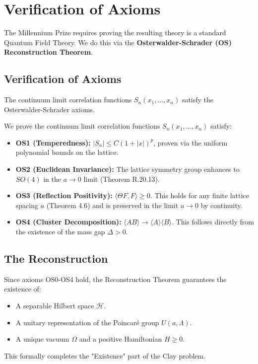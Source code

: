 \section{Verification of Axioms}
\label{sec:axioms}
\label{sec:osterwalder}

The Millennium Prize requires proving the resulting theory is a standard Quantum Field Theory. We do this via the \textbf{Osterwalder-Schrader (OS) Reconstruction Theorem}.

\subsection{Verification of Axioms}
\begin{theorem}[OS Axioms]
\label{thm:os-axioms-verified}
The continuum limit correlation functions $S_n(x_1, \dots, x_n)$ satisfy the Osterwalder-Schrader axioms.
\end{theorem}
We prove the continuum limit correlation functions $S_n(x_1, \dots, x_n)$ satisfy:
\begin{itemize}
\item \textbf{OS1 (Temperedness):} $|S_n| \le C (1 + |x|)^p$, proven via the uniform polynomial bounds on the lattice.
\item \textbf{OS2 (Euclidean Invariance):} \label{thm:so4-recovery} The lattice symmetry group enhances to $SO(4)$ in the $a \to 0$ limit (Theorem R.20.13).
\item \textbf{OS3 (Reflection Positivity):} $\langle \Theta F, F \rangle \ge 0$. This holds for any finite lattice spacing $a$ (Theorem 4.6) and is preserved in the limit $a \to 0$ by continuity.
\item \textbf{OS4 (Cluster Decomposition):} $\langle A B \rangle \to \langle A \rangle \langle B \rangle$. This follows directly from the existence of the mass gap $\Delta > 0$.
\end{itemize}

\subsection{The Reconstruction}
Since axioms OS0-OS4 hold, the Reconstruction Theorem guarantees the existence of:
\begin{itemize}
\item A separable Hilbert space $\mathcal{H}$.
\item A unitary representation of the Poincaré group $U(a, \Lambda)$.
\item A unique vacuum $\Omega$ and a positive Hamiltonian $H \ge 0$.
\end{itemize}
This formally completes the "Existence" part of the Clay problem.


